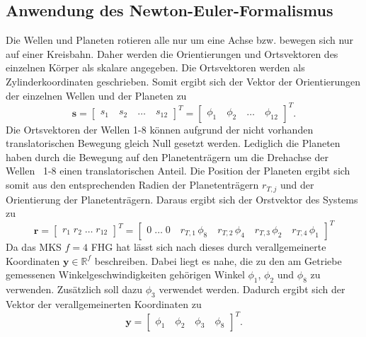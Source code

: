 \subsection{Anwendung des Newton-Euler-Formalismus}\label{ssec:AnwNE}
Die Wellen und Planeten rotieren alle nur um eine Achse bzw. bewegen sich nur auf einer Kreisbahn. Daher werden die Orientierungen und Ortsvektoren des einzelnen Körper als skalare angegeben. Die Ortsvektoren werden als Zylinderkoordinaten geschrieben. Somit ergibt sich der Vektor der Orientierungen der einzelnen Wellen und der Planeten zu 
\begin{equation}
\pmb{s} = \begin{bmatrix} s_{1}\quad s_{2}\quad \dots \quad s_{12} \end{bmatrix}^T = \begin{bmatrix} \phi_{1}\quad \phi_{2}\quad \dots \quad \phi_{12} \end{bmatrix}^T.
\end{equation} 
Die Ortsvektoren der Wellen 1-8 können aufgrund der nicht vorhanden translatorischen Bewegung gleich Null gesetzt werden. Lediglich die Planeten haben durch die Bewegung auf den Planetenträgern um die Drehachse der Wellen~ 1-8 einen translatorischen Anteil. Die Position der Planeten ergibt sich somit aus den entsprechenden Radien der Planetenträgern $r_{T,j}$ und der Orientierung der Planetenträgern. Daraus ergibt sich der Orstvektor des Systems zu
\begin{equation}
\pmb{r} = \begin{bmatrix} r_{1}\; r_{2}\; \dots \; r_{12} \end{bmatrix}^T = \begin{bmatrix} 0\; \dots \; 0 \quad r_{T,1}\,\phi_8 \quad r_{T,2}\,\phi_4 \quad r_{T,3}\,\phi_2 \quad r_{T,4}\,\phi_1 \end{bmatrix}^T
\end{equation}
Da das MKS $f=4$ FHG hat lässt sich nach \cite{Schiehlen.2017} dieses durch verallgemeinerte Koordinaten $\pmb{y}\in \mathbb{R}^f$ beschreiben. Dabei liegt es nahe, die zu den am Getriebe gemessenen Winkelgeschwindigkeiten gehörigen Winkel $\phi_{1}$, $\phi_{2}$ und $\phi_{8}$ zu verwenden. Zusätzlich soll dazu $\phi_{3}$ verwendet werden. Dadurch ergibt sich der Vektor der verallgemeinerten Koordinaten zu
\begin{equation}
\pmb{y} = \begin{bmatrix} \phi_{1}\quad \phi_{2}\quad \phi_{3}\quad \phi_{8} \end{bmatrix}^T.
\end{equation}
